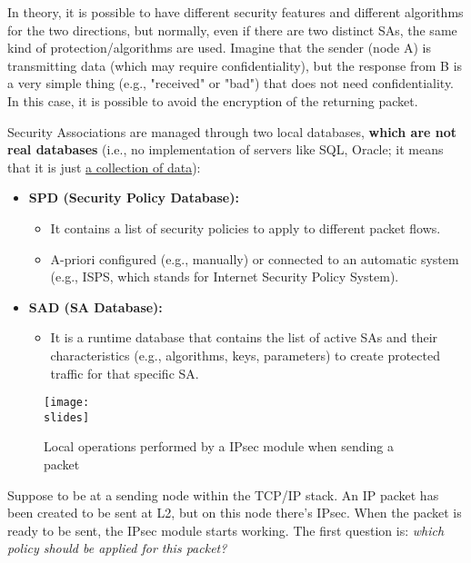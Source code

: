 In theory, it is possible to have different security features and different algorithms for the two directions, but normally, even if there are two distinct SAs, the same kind of protection/algorithms are used.
Imagine that the sender (node A) is transmitting data (which may require confidentiality), but the response from B is a very simple thing (e.g., "received" or "bad") that does not need confidentiality. In this case, it is possible to avoid the encryption of the returning packet.

Security Associations are managed through two local databases, \textbf{which are not real databases}
(i.e., no implementation of servers like SQL, Oracle; it means that it is just \ul{a collection of data}):


\begin{itemize}
    \item \textbf{SPD (Security Policy Database):}
          \begin{itemize}
              \item It contains a list of security policies to apply to different packet flows.
              \item A-priori configured (e.g., manually) or connected to an automatic system (e.g., ISPS, which stands for Internet Security Policy System).
          \end{itemize}
    \item \textbf{SAD (SA Database):}
          \begin{itemize}
              \item It is a runtime database that contains the list of active SAs and their characteristics (e.g., algorithms, keys, parameters) to create protected traffic for that specific SA.
          \end{itemize}
\end{itemize}

\begin{figure}[h]
    \centering
    \texttt{[image: \\slides]}
    \caption{Local operations performed by a IPsec module when sending a packet}
\end{figure}

Suppose to be at a sending node within the TCP/IP stack. An IP packet has been created to be sent at L2, but on this node there's IPsec. When the packet is ready to be sent, the IPsec module starts working. The first question is: \textit{which policy should be applied for this packet?}

